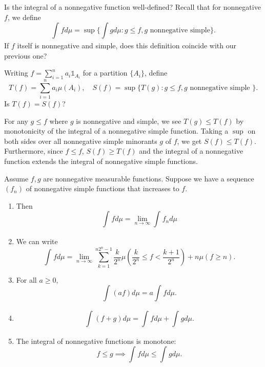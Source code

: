 Is the integral of a nonnegative function well-defined? 
Recall that for nonnegative $f$, we define \[
	\int_{}^{} fd\mu = \sup \{\int gd\mu: g\le f, g \text{ nonnegative simple} \} 
.\] 
If $f$ itself is nonnegative and simple, does this definition coincide with our previous one?

Writing $f = \sum_{i=1}^{n} a_i \mathds{1}_{A_i}$ for a partition $\{A_i\}$, define \[
	T(f) = \sum_{i=1}^{n}a_i \mu(A_i), \quad S(f) = \sup \{T(g): g \le f, g \text{ nonnegative simple }\}
.\] Is $T(f) = S(f)$?

For any $g \le f$ where $g$ is nonnegative and simple, we see $T(g) \le T(f)$ by monotonicity of the integral of a nonnegative simple function.
Taking a $\sup$ on both sides over all nonnegative simple minorants $g$ of $f$, we get $S(f) \le T(f)$. Furthermore, since $f \le f$, $S(f) \ge T(f)$ and the integral of a nonnegative function extends the integral of nonnegative simple functions.

\begin{lemma} \label{2-2-1}
	Assume $f,g$ are nonnegative measurable functions. Suppose we have a sequence $(f_n)$ of nonnegative simple functions that increases to $f$. 
	\begin{enumerate}[label=(\roman*)]
		\item Then \[
			\int_{}^{} fd\mu = \lim\limits_{n \to \infty} \int_{}^{} f_n d\mu  
		\] 
		\item We can write \[
			\int_{}^{} fd\mu = \lim\limits_{n \to \infty} \sum\limits_{k=1}^{n2^n - 1}  \frac{k}{2^n} \mu\left( \frac{k}{2^n} \le f < \frac{k+1}{2^n} \right) + n \mu\left( f \ge n \right) 
		.\] 
		\item For all $a \ge 0$, \[
			\int_{}^{} (af)d\mu = a \int_{}^{} fd\mu  
		.\] 
		\item \[
			\int_{}^{} (f+g)d\mu= \int_{}^{} fd\mu + \int_{}^{} g d\mu   
		.\] 
		\item The integral of nonnegative functions is monotone: \[
			f\le g \implies \int_{}^{} fd\mu \le \int_{}^{} gd\mu  
		.\] 
	\end{enumerate}
\end{lemma}

